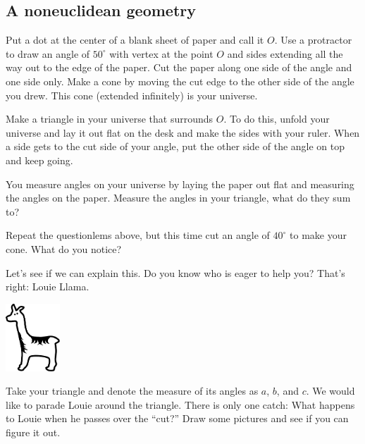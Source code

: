 \documentclass{ximera}
\begin{document}
\subsection*{A noneuclidean geometry}


Put a dot at the center of a blank sheet of paper and call it $O$.
Use a protractor to draw an angle of $50^\circ$ with vertex at the
point $O$ and sides extending all the way out to the edge of the
paper.  Cut the paper along one side of the angle and one side only.
Make a cone by moving the cut edge to the other side of the angle you
drew.  This cone (extended infinitely) is your universe.


\begin{question}
Make a triangle in your universe that surrounds $O$. To do this,
unfold your universe and lay it out flat on the desk and make the
sides with your ruler.  When a side gets to the cut side of your
angle, put the other side of the angle on top and keep going.
\end{question}

\begin{question}
You measure angles on your universe by laying the paper out flat and
measuring the angles on the paper. Measure the angles in your
triangle, what do they sum to?
\end{question}


\begin{question}
Repeat the questionlems above, but this time cut an angle of $40^\circ$ to
make your cone. What do you notice?
\end{question}

Let's see if we can explain this. Do you know who is eager to help
you? That's right: Louie Llama.
\begin{image}
\includegraphics[height=1in]{llama.pdf}
\end{image}

\begin{question}
Take your triangle and denote the measure of its angles as $a$, $b$,
and $c$. We would like to parade Louie around the triangle. There is
only one catch: What happens to Louie when he passes over the ``cut?''
Draw some pictures and see if you can figure it out.
\end{question}
\end{document}
